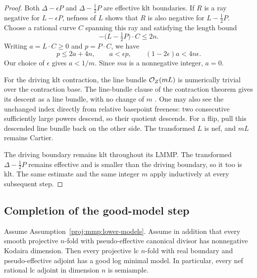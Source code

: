 \begin{proof}
Both \(\Delta-\epsilon P\) and \(\Delta-\tfrac12P\) are
effective klt boundaries. If \(R\) is a ray negative for
\(L-\epsilon P\), nefness of \(L\) shows that \(R\) is also
negative for \(L-\tfrac12P\).
Choose a rational curve \(C\) spanning this ray and satisfying
the length bound
\[
 -\bigl(L-\tfrac12P\bigr)\cdot C\leq 2n.
\]
Writing \(a=L\cdot C\geq 0\) and \(p=P\cdot C\), we have
\[
 p\leq 2a+4n,\qquad a<\epsilon p,
 \qquad
 (1-2\epsilon)a<4n\epsilon.
\]
Our choice of \(\epsilon\) gives \(a<1/m\).
Since \(ma\) is a nonnegative integer, \(a=0\).

For the driving klt contraction, the line bundle
\(\mathcal{O}_Z(mL)\) is numerically trivial over the contraction base.
The line-bundle clause of the contraction theorem gives its
descent as a line bundle, with no change of \(m\)
\cite[Theorem~3.74(3)]{Proj-Fujino2017}.
One may also see the unchanged index directly from relative
basepoint freeness: two consecutive sufficiently large powers
descend, so their quotient descends.
For a flip, pull this descended line bundle back on the other
side. The transformed \(L\) is nef, and \(mL\) remains Cartier.

The driving boundary remains klt throughout its LMMP.
The transformed \(\Delta-\tfrac12P\) remains effective and
is smaller than the driving boundary, so it too is klt.
The same estimate and the same integer \(m\) apply inductively
at every subsequent step.
\end{proof}

\subsection{Completion of the good-model step}

\begin{proposition}
\label{proj:prop:inductive-reduction}
Assume Assumption~\ref{proj:mmp:lower-models}. Assume in addition that
every smooth projective \(n\)-fold with pseudo-effective
canonical divisor has nonnegative Kodaira dimension.
Then every projective lc \(n\)-fold with real boundary and
pseudo-effective adjoint has a good log minimal model.
In particular, every nef rational lc adjoint in dimension \(n\)
is semiample.
\end{proposition}

